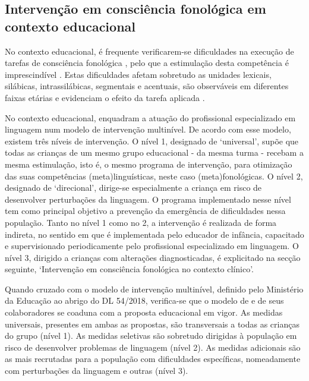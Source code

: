 \documentclass[output=paper,colorlinks,citecolor=brown,booklanguage=portuguese]{langscibook}
\begin{document}
\subsection{Intervenção em consciência fonológica em contexto educacional}
No contexto educacional, é frequente verificarem-se dificuldades na execução de tarefas de consciência fonológica \citep{Alves2012, Carvalho2012}, pelo que a estimulação desta competência é imprescindível \citep{Freitas2007, Carvalho2012}. Estas dificuldades afetam sobretudo as unidades lexicais, silábicas, intrassilábicas, segmentais e acentuais, são observáveis em diferentes faixas etárias \citep{Araujo2004, Alves2012, Castelo2012, Afonso2015, Freitas2019} e evidenciam o efeito da tarefa aplicada \citep{Afonso2015}.

No contexto educacional, \citet{Ebbels2017} enquadram a atuação do profissional especializado em linguagem num modelo de intervenção multinível. De acordo com esse modelo, existem três níveis de intervenção. O nível 1, designado de ‘universal’, supõe que todas as crianças de um mesmo grupo educacional - da mesma turma - recebam a mesma estimulação, isto é, o mesmo programa de intervenção, para otimização das suas competências (meta)linguísticas, neste caso (meta)fonológicas. O nível 2, designado de ‘direcional’, dirige-se especialmente a criança em risco de desenvolver perturbações da linguagem. O programa implementado nesse nível tem como principal objetivo a prevenção da emergência de dificuldades nessa população. Tanto no nível 1 como no 2, a intervenção é realizada de forma indireta, no sentido em que é implementada pelo educador de infância, capacitado e supervisionado periodicamente pelo profissional especializado em linguagem. O nível 3, dirigido a crianças com alterações diagnosticadas, é explicitado na secção seguinte, ‘Intervenção em consciência fonológica no contexto clínico’.

Quando cruzado com o modelo de intervenção multinível, definido pelo Ministério da Educação ao abrigo do DL 54/2018, verifica-se que o modelo de \citeauthor{Ebbels2017} e de seus colaboradores se coaduna com a proposta educacional em vigor. As medidas universais, presentes em ambas as propostas, são transversais a todas as crianças do grupo (nível 1). As medidas seletivas são sobretudo dirigidas à população em risco de desenvolver problemas de linguagem (nível 2). As medidas adicionais são as mais recrutadas para a população com dificuldades específicas, nomeadamente com perturbações da linguagem e outras (nível 3).
\end{document}
